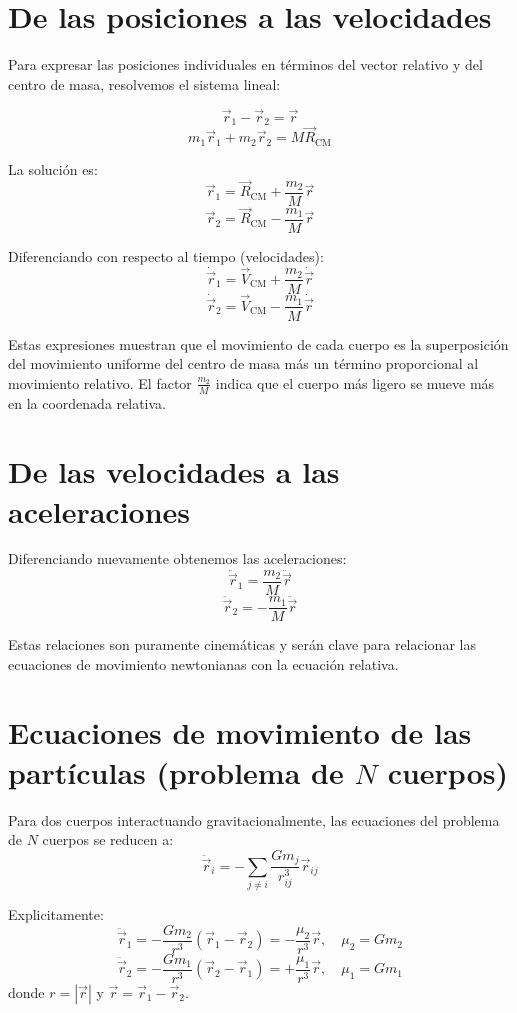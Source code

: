 \documentclass[12pt,oneside]{book}
\begin{document}
\section{De las posiciones a las velocidades}
Para expresar las posiciones individuales en términos del vector relativo y del centro de masa, resolvemos el sistema lineal:

\[
\vec{r}_1 - \vec{r}_2 = \vec{r}
\]
\[
m_1 \vec{r}_1 + m_2 \vec{r}_2 = M \vec{R}_{\text{CM}}
\]

La solución es:
\[
\vec{r}_1 = \vec{R}_{\text{CM}} + \frac{m_2}{M} \vec{r}
\]
\[
\vec{r}_2 = \vec{R}_{\text{CM}} - \frac{m_1}{M} \vec{r}
\]

Diferenciando con respecto al tiempo (velocidades):
\[
\dot{\vec{r}}_1 = \vec{V}_{\text{CM}} + \frac{m_2}{M} \dot{\vec{r}}
\]
\[
\dot{\vec{r}}_2 = \vec{V}_{\text{CM}} - \frac{m_1}{M} \dot{\vec{r}}
\]

\begin{importante}
Estas expresiones muestran que el movimiento de cada cuerpo es la superposición del movimiento uniforme del centro de masa más un término proporcional al movimiento relativo. El factor \(\frac{m_2}{M}\) indica que el cuerpo más ligero se mueve más en la coordenada relativa.
\end{importante}

\section{De las velocidades a las aceleraciones}
Diferenciando nuevamente obtenemos las aceleraciones:
\[
\ddot{\vec{r}}_1 = \frac{m_2}{M} \ddot{\vec{r}}
\]
\[
\ddot{\vec{r}}_2 = -\frac{m_1}{M} \ddot{\vec{r}}
\]

Estas relaciones son puramente cinemáticas y serán clave para relacionar las ecuaciones de movimiento newtonianas con la ecuación relativa.

\section{Ecuaciones de movimiento de las partículas (problema de \(N\) cuerpos)}
Para dos cuerpos interactuando gravitacionalmente, las ecuaciones del problema de \(N\) cuerpos se reducen a:
\[
\ddot{\vec{r}}_i = -\sum_{j \neq i} \frac{G m_j}{r_{ij}^3} \vec{r}_{ij}
\]

Explicitamente:
\[
\ddot{\vec{r}}_1 = -\frac{G m_2}{r^3} (\vec{r}_1 - \vec{r}_2) = -\frac{\mu_2}{r^3} \vec{r}, \quad \mu_2 = G m_2
\]
\[
\ddot{\vec{r}}_2 = -\frac{G m_1}{r^3} (\vec{r}_2 - \vec{r}_1) = +\frac{\mu_1}{r^3} \vec{r}, \quad \mu_1 = G m_1
\]
donde \(r = |\vec{r}|\) y \(\vec{r} = \vec{r}_1 - \vec{r}_2\).
\end{document}
